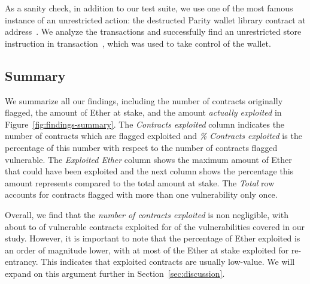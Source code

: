  As a sanity check, in addition to our test suite, we use one of the most famous instance of an unrestricted action: the destructed Parity wallet library contract at address~. We analyze the transactions and successfully find an unrestricted store instruction in transaction~, which was used to take control of the wallet.

\subsection{Summary}
We summarize all our findings, including the number of contracts originally flagged, the amount of Ether at stake, and the amount \emph{actually exploited} in Figure~\ref{fig:findings-summary}. The \emph{Contracts exploited} column indicates the number of contracts which are flagged exploited and \emph{\% Contracts exploited} is the percentage of this number with respect to the number of contracts flagged vulnerable. The \emph{Exploited Ether} column shows the maximum amount of Ether that could have been exploited and the next column shows the percentage this amount represents compared to the total amount at stake. The \emph{Total} row accounts for contracts flagged with more than one vulnerability only once.

Overall, we find that the \emph{number of contracts exploited} is non negligible, with about  to  of vulnerable contracts exploited for  of the \VulnTypesNum vulnerabilities covered in our study.
However, it is important to note that the percentage of Ether exploited is an order of magnitude lower, with at most  of the Ether at stake exploited for re-entrancy.
This indicates that exploited contracts are usually low-value.
We will expand on this argument further in Section~\ref{sec:discussion}.



